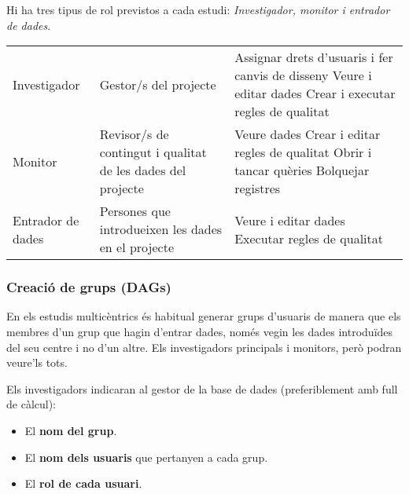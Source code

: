 \documentclass[
]{article}
\providecommand{\tightlist}{%
  \setlength{\itemsep}{0pt}\setlength{\parskip}{0pt}}
\begin{document}
Hi ha tres tipus de rol previstos a cada estudi: \emph{Investigador, monitor i entrador de dades}.

\begin{table}[!h]
\centering\begingroup\fontsize{13}{15}\selectfont

\begin{tabular}{l|l|l}
\hline
\cellcolor[HTML]{993489}{\textcolor{white}{Rol}} & \cellcolor[HTML]{993489}{\textcolor{white}{Assignació}} & \cellcolor[HTML]{993489}{\textcolor{white}{Privilegis}}\\
\hline
Investigador & Gestor/s del projecte & Assignar drets d’usuaris i fer canvis de disseny
Veure i editar dades
Crear i  executar regles de qualitat
\cellcolor{gray!6}{Crear i modificar registres}\\
\hline
Monitor & Revisor/s de contingut i qualitat de les dades del projecte & Veure dades
Crear i editar regles de qualitat
Obrir i tancar quèries
Bolquejar registres\\
\hline
Entrador de dades & Persones que introdueixen les dades en el projecte & Veure i editar dades
Executar regles de qualitat
\cellcolor{gray!6}{Respondre a quèries}\\
\hline
\end{tabular}
\endgroup{}
\end{table}

\hypertarget{creaciuxf3-de-grups-dags}{%
\subsubsection{\texorpdfstring{\textbf{Creació de grups (DAGs)}}{Creació de grups (DAGs)}}\label{creaciuxf3-de-grups-dags}}

En els estudis multicèntrics és habitual generar grups d'usuaris de manera que els membres d'un grup que hagin d'entrar dades, només vegin les dades introduïdes del seu centre i no d'un altre. Els investigadors principals i monitors, però podran veure'ls tots.

Els investigadors indicaran al gestor de la base de dades (preferiblement amb full de càlcul):

\begin{itemize}
\tightlist
\item
  El \textbf{nom del grup}.
\item
  El \textbf{nom dels usuaris} que pertanyen a cada grup.
\item
  El \textbf{rol de cada usuari}.
\end{itemize}
\end{document}
